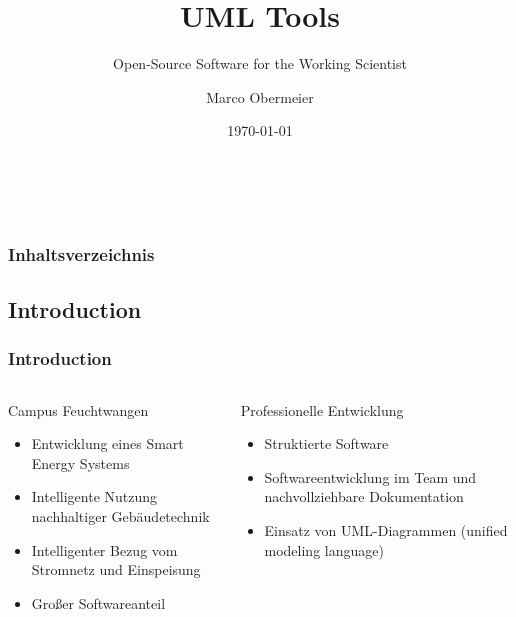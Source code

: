 \documentclass[xcolor=dvipsnames]{beamer}
\title{ UML Tools}
\subtitle{Open-Source Software for the Working Scientist \\}
\institute{Master of Applied Research\\ Hochschule Ansbach\\}
\author{Marco Obermeier}
\date{\today}
\begin{document}
 
	\begin{frame}
		\frametitle{~}
		\maketitle 
	\end{frame}
	\begin{frame}
		\frametitle{Inhaltsverzeichnis}
		\tableofcontents
	\end{frame}
	
	
	\begin{frame}
		\section{Introduction}
		\frametitle{Introduction}
		\begin{columns}
			\begin{column}{0.50\textwidth}
				\begin{block}{Campus Feuchtwangen}
					\begin{itemize}
						\item Entwicklung eines Smart Energy Systems
						\item Intelligente Nutzung nachhaltiger Gebäudetechnik
						\item Intelligenter Bezug vom Stromnetz und Einspeisung
						\item Großer Softwareanteil
					\end{itemize}
				\end{block}
			\end{column}
			
			\begin{column}{0.50\textwidth}
				\begin{block}{Professionelle Entwicklung}
					\begin{itemize}
						\item Struktierte Software
						\item Softwareentwicklung im Team und nachvollziehbare Dokumentation
						\item Einsatz von UML-Diagrammen (unified modeling language)
					\end{itemize}
				\end{block}
			\end{column}
		\end{columns}
		
	\end{frame}
	
\end{document}
